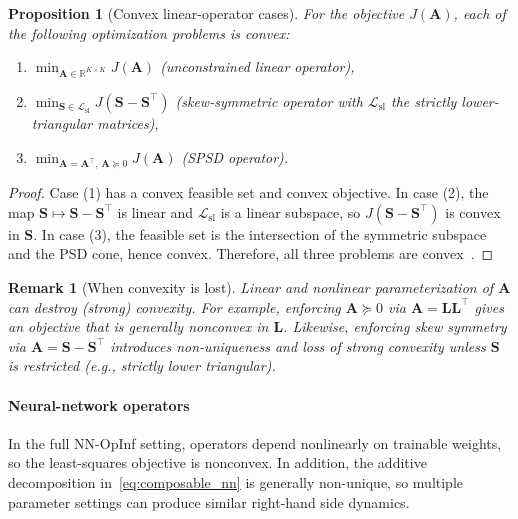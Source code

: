 \documentclass[3p,computermodern,11pt]{elsarticle}
\newtheorem{proposition}{Proposition}[section]
\newtheorem{remark}{Remark}[section]
\numberwithin{equation}{section}
\newcommand{\RR}[1]{\mathbb{R}^{#1}}
\newcommand{\romDim}{K}
\begin{document}
\begin{proposition}[Convex linear-operator cases]
For the objective $J(\mathbf{A})$, each of the following optimization problems is convex:
\begin{enumerate}
    \item[(i)] $\min_{\mathbf{A}\in\RR{\romDim\times\romDim}} J(\mathbf{A})$ (unconstrained linear operator),
    \item[(ii)] $\min_{\mathbf{S}\in\mathcal{L}_{\mathrm{sl}}} J(\mathbf{S}-\mathbf{S}^{\intercal})$ (skew-symmetric operator with $\mathcal{L}_{\mathrm{sl}}$ the strictly lower-triangular matrices),
    \item[(iii)] $\min_{\mathbf{A}=\mathbf{A}^{\intercal},\,\mathbf{A}\succeq 0} J(\mathbf{A})$ (SPSD operator).
\end{enumerate}
\end{proposition}
\begin{proof}
Case (1) has a convex feasible set and convex objective. In case (2), the map $\mathbf{S}\mapsto \mathbf{S}-\mathbf{S}^{\intercal}$ is linear and $\mathcal{L}_{\mathrm{sl}}$ is a linear subspace, so $J(\mathbf{S}-\mathbf{S}^{\intercal})$ is convex in $\mathbf{S}$. In case (3), the feasible set is the intersection of the symmetric subspace and the PSD cone, hence convex. Therefore, all three problems are convex~\cite{BoydVandenberghe04}.
\end{proof}

\begin{remark}[When convexity is lost]
Linear and nonlinear parameterization of $\mathbf{A}$ can destroy (strong) convexity. For example, enforcing $\mathbf{A}\succeq 0$ via $\mathbf{A}=\mathbf{L}\mathbf{L}^\intercal$ gives an objective that is generally nonconvex in $\mathbf{L}$. Likewise, enforcing skew symmetry via $\mathbf{A}=\mathbf{S}-\mathbf{S}^\intercal$ introduces non-uniqueness and loss of strong convexity unless $\mathbf{S}$ is restricted (e.g., strictly lower triangular).
\end{remark}


\paragraph{Neural-network operators}
In the full NN-OpInf setting, operators depend nonlinearly on trainable weights, so the least-squares objective is nonconvex. In addition, the additive decomposition in~\eqref{eq:composable_nn} is generally non-unique, so multiple parameter settings can produce similar right-hand side dynamics.
\end{document}
